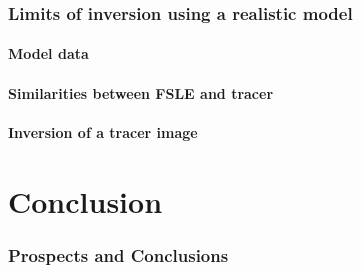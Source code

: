 \documentclass[compress,slidescentered,notes=show]{beamer}
\begin{document}
\section[Realistic Model data]{Limits of inversion using a realistic model}


	\subsection{Model data}
\begin{frame}
\end{frame}

	\subsection{Similarities between FSLE and tracer}
\begin{frame}
\end{frame}

	\subsection{Inversion of a tracer image}
\begin{frame}
\end{frame}

\part{Conclusion}
\section{Prospects and Conclusions}
\end{document}
